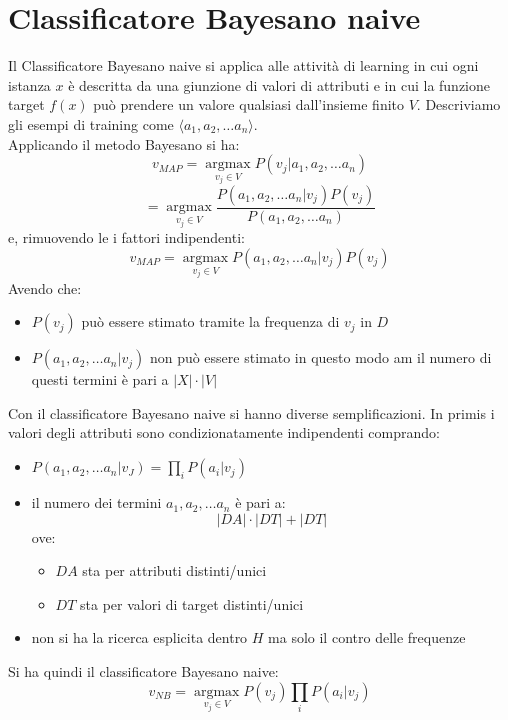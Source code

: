 \documentclass[a4paper,12pt, oneside]{book}
\begin{document}
\section{Classificatore Bayesano naive}
Il Classificatore Bayesano naive si applica alle attività di learning in
cui ogni istanza $x$ è descritta da una giunzione di valori di attributi e in
cui la funzione target $f(x)$ può prendere un valore qualsiasi dall'insieme
finito $V$. Descriviamo gli esempi di training come $\langle a_1, a_2,\ldots
a_n\rangle $. \\
Applicando il metodo Bayesano si ha:
\[v_{MAP}=\operatorname*{argmax}_{v_j\in V}P(v_j|a_1, a_2,\ldots a_n)\]
\[=\operatorname*{argmax}_{v_j\in V}\frac{P(a_1, a_2,\ldots
    a_n|v_j)P(v_j)}{P(a_1, a_2,\ldots a_n)}\]
e, rimuovendo le i fattori indipendenti:
\[v_{MAP}=\operatorname*{argmax}_{v_j\in V}P(a_1, a_2,\ldots a_n|v_j)P(v_j)\]
Avendo che:
\begin{itemize}
  \item $P(v_j)$ può essere stimato tramite la frequenza di $v_j$ in $D$
  \item $P(a_1, a_2,\ldots a_n|v_j)$ non può essere stimato in questo modo am il
  numero di questi termini è pari a $|X|\cdot |V|$
\end{itemize}
Con il classificatore Bayesano naive si hanno diverse semplificazioni. In primis
i valori degli attributi sono condizionatamente indipendenti comprando:
\begin{itemize}
  \item $P(a_1, a_2,\ldots a_n|v_J)=\prod_iP(a_i|v_j)$
  \item il numero dei termini $a_1, a_2,\ldots a_n$ è pari a:
  \[|DA|\cdot |DT|+|DT|\]
  ove:
  \begin{itemize}
    \item $DA$ sta per attributi distinti/unici
    \item $DT$ sta per valori di target distinti/unici
  \end{itemize}
  \item non si ha la ricerca esplicita dentro $H$ ma solo il contro delle
  frequenze 
\end{itemize}
Si ha quindi il classificatore Bayesano naive:
\[v_{NB}=\operatorname*{argmax}_{v_j\in V}P(v_j)\prod_iP(a_i|v_j)\]
\newpage
\end{document}
